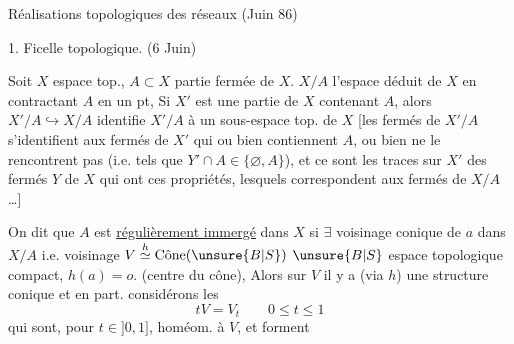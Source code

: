 Réalisations topologiques des réseaux \hfill (Juin 86)


1. Ficelle topologique. (6 Juin)

Soit $X$ espace top., $A\subset X$ partie fermée  de $X$.
 $X/A$ l'espace déduit de $X$ en contractant $A$ en un pt,
Si $X'$ est une partie de $X$ contenant $A$, alors $X'/A\hookrightarrow X/A$ identifie $X'/A$ à un sous-espace top. de $X$
[les fermés de $X'/A$ s'identifient aux fermés   de $X'$ qui ou bien contiennent $A$, ou bien ne le rencontrent pas (i.e. tels que $Y'\cap A\in\{\varnothing,A\}$), et ce sont les traces sur $X'$ des fermés $Y$ de $X$ qui ont ces  propriétés, lesquels correspondent  aux fermés de $X/A$ \ldots]

On dit que $A$ est \uline{régulièrement immergé} dans $X$
si $\exists$ voisinage  conique de $a$ dans $X/A$
i.e. voisinage 
$V\overset{h}{\simeq}\operatorname{\text{Cône}}(\unsure{B|S})$
$\unsure{B|S}$ espace topologique compact, $h(a)=o$.
(centre du cône),
 Alors  sur $V$ il y a (via $h$) une structure conique et en part. considérons les
\[
tV=V_t\qquad 0\le t\le1
\]
qui sont, pour $t\in]0,1]$, homéom. à $V$, et forment



